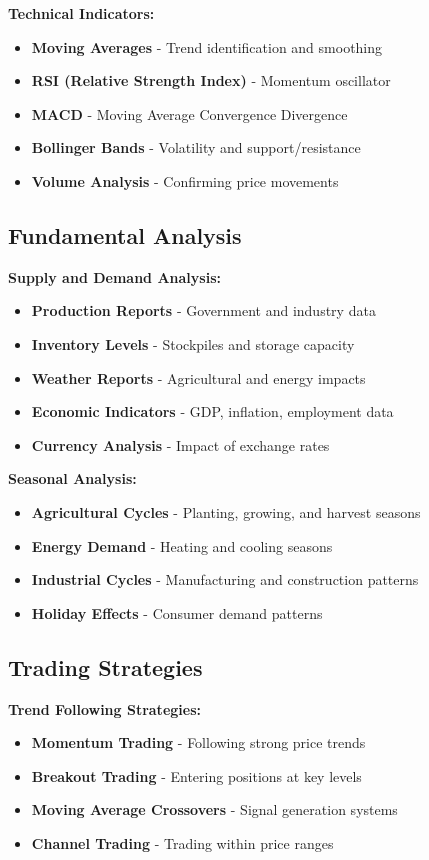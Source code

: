 \documentclass[12pt]{article}
\begin{document}
\textbf{Technical Indicators:}
\begin{itemize}
    \item \textbf{Moving Averages} - Trend identification and smoothing
    \item \textbf{RSI (Relative Strength Index)} - Momentum oscillator
    \item \textbf{MACD} - Moving Average Convergence Divergence
    \item \textbf{Bollinger Bands} - Volatility and support/resistance
    \item \textbf{Volume Analysis} - Confirming price movements
\end{itemize}

\subsection{Fundamental Analysis}

\textbf{Supply and Demand Analysis:}
\begin{itemize}
    \item \textbf{Production Reports} - Government and industry data
    \item \textbf{Inventory Levels} - Stockpiles and storage capacity
    \item \textbf{Weather Reports} - Agricultural and energy impacts
    \item \textbf{Economic Indicators} - GDP, inflation, employment data
    \item \textbf{Currency Analysis} - Impact of exchange rates
\end{itemize}

\textbf{Seasonal Analysis:}
\begin{itemize}
    \item \textbf{Agricultural Cycles} - Planting, growing, and harvest seasons
    \item \textbf{Energy Demand} - Heating and cooling seasons
    \item \textbf{Industrial Cycles} - Manufacturing and construction patterns
    \item \textbf{Holiday Effects} - Consumer demand patterns
\end{itemize}

\subsection{Trading Strategies}

\textbf{Trend Following Strategies:}
\begin{itemize}
    \item \textbf{Momentum Trading} - Following strong price trends
    \item \textbf{Breakout Trading} - Entering positions at key levels
    \item \textbf{Moving Average Crossovers} - Signal generation systems
    \item \textbf{Channel Trading} - Trading within price ranges
\end{itemize}
\end{document}
